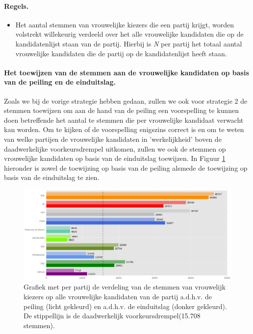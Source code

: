 \paragraph{Regels.}
\begin{itemize}
	\item
Het aantal stemmen van vrouwelijke kiezers die een partij krijgt, worden volstrekt willekeurig verdeeld over het alle vrouwelijke kandidaten die op de kandidatenlijst staan van de partij. Hierbij is \textit{N} per partij het totaal aantal vrouwelijke kandidaten die de partij op de kandidatenlijst heeft staan. 	\\ 	
\end{itemize}	

\paragraph{Het toewijzen van de stemmen aan de vrouwelijke kandidaten op basis van de peiling en de einduitslag.}
Zoals we bij de vorige strategie hebben gedaan, zullen we ook voor strategie 2 de stemmen toewijzen om aan de hand van de peiling een voorspelling te kunnen doen betreffende het aantal te stemmen die per vrouwelijke kandidaat verwacht kan worden. Om te kijken of de voorspelling enigszins correct is en om te weten van welke partijen de vrouwelijke kandidaten in 'werkelijkheid' boven de daadwerkelijke voorkeursdrempel uitkomen, zullen we ook de stemmen op vrouwelijke kandidaten op basis van de einduitslag toewijzen. In Figuur \ref{fig:stemmenS2V}  hieronder is zowel de toewijzing op basis van de peiling alsmede de toewijzing op basis van de einduitslag te zien.   



\begin{figure}[H]

	\includegraphics[width=\linewidth]	{stemmen_op_vrouwen_willekeurig_samen.png}

			\caption{Grafiek met per partij de verdeling van de stemmen van vrouwelijk kiezers op alle vrouwelijke kandidaten van de partij a.d.h.v. de peiling (licht gekleurd) en a.d.h.v. de einduitslag (donker gekleurd). De stippellijn is de daadwerkelijk voorkeursdrempel(15.708 stemmen).}

\label{fig:stemmenS2V}
\end{figure}


